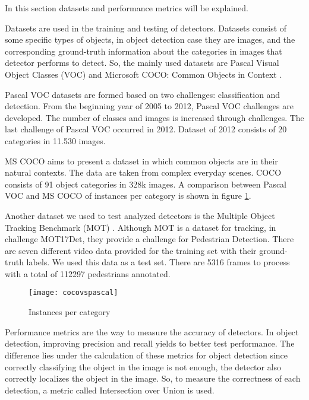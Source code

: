\documentclass{article}
\begin{document}
\setlength{\parindent}{6ex}

\indent

In this section datasets and performance metrics will be explained. \par 
Datasets are used in the training and testing of detectors. Datasets consist of some 
specific types of objects, in object detection case they are images, and the 
corresponding ground-truth information about the categories in images that 
detector performs to detect. So, the mainly used datasets are Pascal Visual Object 
Classes (VOC) \cite{pascalvoc} and Microsoft COCO: Common Objects in Context 
\cite{mscoco}. \par

Pascal VOC datasets are formed based on two challenges: classification and detection. From the 
beginning year of 2005 to 2012, Pascal VOC challenges are developed. The number of classes and images 
is increased through challenges. The last challenge of Pascal VOC occurred in 2012. Dataset of 
2012 consists of 20 categories in 11.530 images. \par

MS COCO aims to present a dataset in which common objects are in their natural 
contexts. The data are taken from complex everyday scenes. COCO consists of 91 
object categories in 328k images. A comparison between Pascal VOC and MS COCO 
of instances per category is shown in figure \ref{fig:cocovspascal1}. \par

Another dataset we used to test analyzed detectors is the Multiple Object Tracking Benchmark 
(MOT) \cite{mot}. Although MOT is a dataset for tracking, in challenge MOT17Det, they provide a 
challenge for Pedestrian Detection. There are seven different video data provided for 
the training set with their ground-truth labels. We used this data as a test set. There are 
5316 frames to process with a total of 112297 pedestrians annotated. 

\begin{figure}
    \centering
    \texttt{[image: cocovspascal]}
    \caption{Instances per category \cite{mscoco}}
    \label{fig:cocovspascal1}
\end{figure}
\indent

Performance metrics are the way to measure the accuracy of detectors. In object 
detection, improving precision and recall yields to better test performance. The 
difference lies under the calculation of these metrics for object detection since 
correctly classifying the object in the image is not enough, the detector also correctly 
localizes the object in the image. So, to measure the correctness of each detection, 
a metric called Intersection over Union is used.
\end{document}
